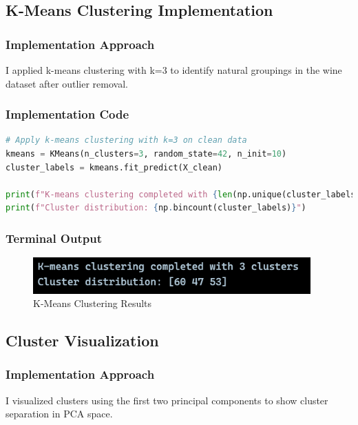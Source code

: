 \documentclass[12pt,a4paper]{article}
\begin{document}
\newpage 

\subsection{K-Means Clustering Implementation}

\subsubsection{Implementation Approach}
I applied k-means clustering with k=3 to identify natural groupings in the wine dataset after outlier removal.

\subsubsection{Implementation Code}
\begin{lstlisting}[language=Python, caption=K-Means Clustering Implementation]
# Apply k-means clustering with k=3 on clean data
kmeans = KMeans(n_clusters=3, random_state=42, n_init=10)
cluster_labels = kmeans.fit_predict(X_clean)

print(f"K-means clustering completed with {len(np.unique(cluster_labels))} clusters")
print(f"Cluster distribution: {np.bincount(cluster_labels)}")
\end{lstlisting}

\subsubsection{Terminal Output}
\begin{figure}[h!]
\centering
    \includegraphics[width=0.95\textwidth]{Figures/kmeans_results.png}
    \caption{K-Means Clustering Results}
\end{figure}

\subsection{Cluster Visualization}

\subsubsection{Implementation Approach}
I visualized clusters using the first two principal components to show cluster separation in PCA space.
\end{document}
